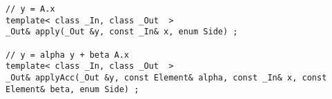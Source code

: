 {
\small
\begin{lstlisting}
// y = A.x
template< class _In, class _Out  >
_Out& apply(_Out &y, const _In& x, enum Side) ;

// y = alpha y + beta A.x
template< class _In, class _Out  >
_Out& applyAcc(_Out &y, const Element& alpha, const _In& x, const Element& beta, enum Side) ;

\end{lstlisting}
}

